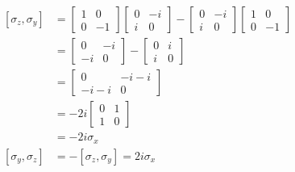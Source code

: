 \documentclass{article}
\begin{document}
\begin{align*}
    \begin{split}
    [\sigma_z, \sigma_y] &=
    \begin{bmatrix}
        1 & 0 \\
        0 & -1
    \end{bmatrix}
    \begin{bmatrix}
        0 & -i \\
        i & 0
    \end{bmatrix}
    - \begin{bmatrix}
        0 & -i \\
        i & 0
    \end{bmatrix}
    \begin{bmatrix}
        1 & 0 \\
        0 & -1
    \end{bmatrix} \\
    &= 
    \begin{bmatrix}
        0 & -i \\
        -i & 0
    \end{bmatrix}
    - \begin{bmatrix}
        0 & i \\
        i & 0
    \end{bmatrix} \\
    &= \begin{bmatrix}
        0 & -i - i \\
        -i - i & 0
    \end{bmatrix} \\
    &= -2i \begin{bmatrix}
        0 & 1 \\
        1 & 0
    \end{bmatrix} \\
    &= -2i\sigma_x \\
    [\sigma_y, \sigma_z] &= -[\sigma_z, \sigma_y] = 2i\sigma_x \\
    \end{split}
\end{align*}
\end{document}

